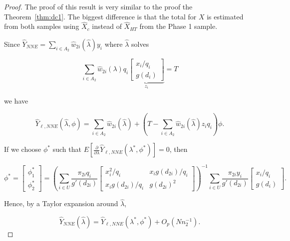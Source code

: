 \documentclass[12pt]{article}
\begin{document}
\begin{proof}
  The proof of this result is very similar to the proof the Theorem~\ref{thm:dc1}.
  The biggest difference is that the total for $X$ is estimated from both samples
  using $\hat X_c$ instead of $\hat X_{HT}$ from the Phase 1 sample.

  Since $\hat Y_{NNE} = \sum_{i \in A_2} \hat w_{2i}(\hat \lambda)y_i$ where
  $\hat \lambda$ solves

  \begin{equation}
    \sum_{i \in A_2} \hat w_{2i}(\lambda) q_i
    \underbrace{
    \begin{bmatrix} 
      x_i / q_i \\ g(d_i)
  \end{bmatrix}}_{z_i} = T
  \end{equation}

  we have 

  $$\hat Y_{\ell, NNE} (\hat \lambda, \phi) = \sum_{i \in A_2} \hat w_{2i}(\hat
  \lambda) + \left(T - \sum_{i \in A_2} \hat w_{2i}(\hat \lambda) z_i q_i\right)
  \phi.$$

  If we choose $\phi^*$ such that $E\left[\frac{\partial}{\partial \lambda} 
    \hat Y_{\ell, NNE}(\lambda^*, \phi^*)\right] = 0$, then

  $$\phi^* =
  \begin{bmatrix}
    \phi^*_1 \\ \phi^*_2
  \end{bmatrix} = 
  \left(\sum_{i \in U} \frac{\pi_{2i} q_i}{g'(d_{2i})} 
  \begin{bmatrix}
    x_i^2 / q_i & x_i g(d_{2i}) / q_i \\
    x_i g(d_{2i}) / q_i & g(d_{2i})^2
  \end{bmatrix}
  \right)^{-1}
  \sum_{i \in U} \frac{\pi_{2i} y_i}{g'(d_{2i})} 
  \begin{bmatrix} x_i / q_i \\ g(d_i) \end{bmatrix}.
  $$

  Hence, by a Taylor expansion around $\hat \lambda$,
  
  $$\hat Y_{NNE}(\hat \lambda) = \hat Y_{\ell, NNE}(\lambda^*, \phi^*) +
  O_p(Nn_2^{-1}).$$

\end{proof}
\end{document}
